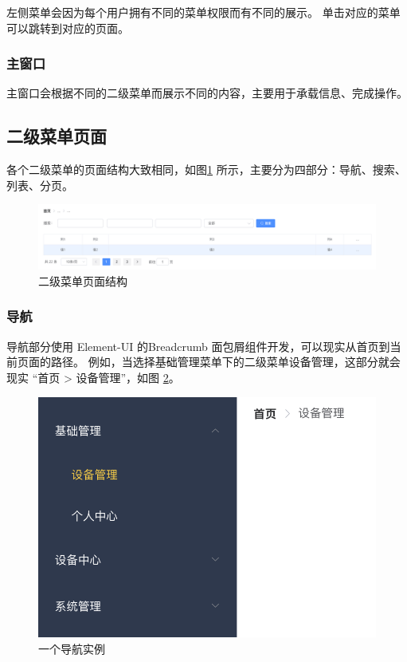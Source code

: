 左侧菜单会因为每个用户拥有不同的菜单权限而有不同的展示。
单击对应的菜单可以跳转到对应的页面。

\subsubsection{主窗口}
主窗口会根据不同的二级菜单而展示不同的内容，主要用于承载信息、完成操作。

\newpage
\subsection{二级菜单页面}
各个二级菜单的页面结构大致相同，如图\ref{Fig:main} 所示，主要分为四部分：导航、搜索、列表、分页。

\begin{figure}[ht]
    \centering
    \includegraphics[width=1\linewidth]{./Figure/IMG_main.png}
    \caption{二级菜单页面结构}\label{Fig:main}
\end{figure}

\subsubsection{导航}
导航部分使用 Element-UI 的Breadcrumb 面包屑组件开发，可以现实从首页到当前页面的路径。
例如，当选择基础管理菜单下的二级菜单设备管理，这部分就会现实 “首页 > 设备管理”，如图 \ref{Fig:eg_main}。

\begin{figure}[ht]
    \centering
    \includegraphics[width=0.6\linewidth]{./Figure/IMG_eg_main.png}
    \caption{一个导航实例}\label{Fig:eg_main}
\end{figure}

